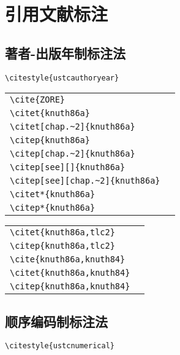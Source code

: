 \chapter{引用文献标注}

\section{著者-出版年制标注法}

\noindent
\verb|\citestyle{ustcauthoryear}|

\noindent
\begin{tabular}{l@{\quad$\Rightarrow$\quad}l}
  \verb|\cite{ZORE}| & \cite{ZORE}\\
  \verb|\citet{knuth86a}| & \citet{knuth86a}\\
  \verb|\citet[chap.~2]{knuth86a}| & \citet[chap.~2]{knuth86a}\\[0.5ex]
  \verb|\citep{knuth86a}| & \citep{knuth86a}\\
  \verb|\citep[chap.~2]{knuth86a}| & \citep[chap.~2]{knuth86a}\\
  \verb|\citep[see][]{knuth86a}| & \citep[see][]{knuth86a}\\
  \verb|\citep[see][chap.~2]{knuth86a}| & \citep[see][chap.~2]{knuth86a}\\[0.5ex]
  \verb|\citet*{knuth86a}| & \citet*{knuth86a}\\
  \verb|\citep*{knuth86a}| & \citep*{knuth86a}\\
\end{tabular}

\noindent
\begin{tabular}{l@{\quad$\Rightarrow$\quad}l}
  \verb|\citet{knuth86a,tlc2}| & \citet{knuth86a,tlc2}\\
  \verb|\citep{knuth86a,tlc2}| & \citep{knuth86a,tlc2}\\
  \verb|\cite{knuth86a,knuth84}| & \cite{knuth86a,knuth84}\\
  \verb|\citet{knuth86a,knuth84}| & \citet{knuth86a,knuth84}\\
  \verb|\citep{knuth86a,knuth84}| & \citep{knuth86a,knuth84}\\
\end{tabular}

\section{顺序编码制标注法}

\noindent
\verb|\citestyle{ustcnumerical}|

